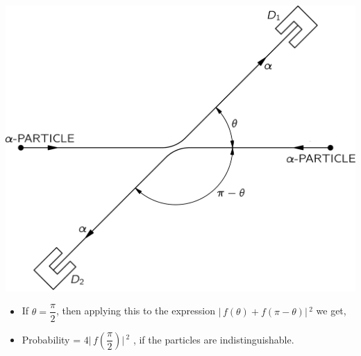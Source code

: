 \documentclass[aspectratio=169]{beamer}
\begin{document}
\begin{frame}

	\begin{multicols}{2}
 
  		\includegraphics[scale=0.45]{alpha-alpha.png}
  
	\columnbreak
	
		\begin{itemize}

			\item If  $\theta = \dfrac{\pi}{2}$,  then applying this to the expression  $\rvert\,f(\theta)+f(\pi-\theta)\rvert\,^{2}$ we get, \pause \newline
			\item Probability = $4 \rvert\,f\left(\dfrac{\pi}{2}\right) \rvert\,^{2}$ , if the particles are indistinguishable.
		
		\end{itemize}
	
	\end{multicols}

	
\end{frame}
\end{document}

